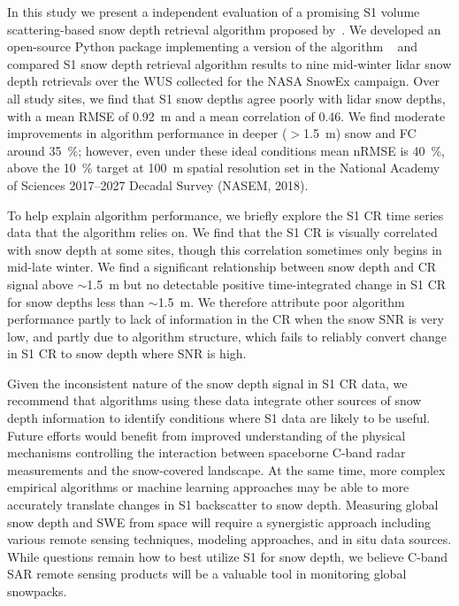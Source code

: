 \documentclass[journal abbreviation, manuscript]{copernicus}
\begin{document}
\conclusions  %

In this study we present a independent evaluation of a promising S1 volume scattering-based snow depth retrieval algorithm proposed by~\citet{Lievens.2022}. We developed an open-source Python package implementing a version of the algorithm ~\citep{Hoppinen.2023} and compared S1 snow depth retrieval algorithm results to nine mid-winter lidar snow depth retrievals over the WUS collected for the NASA SnowEx campaign. Over all study sites, we find that S1 snow depths agree poorly with lidar snow depths, with a mean RMSE of 0.92~m and a mean correlation of 0.46. We find moderate improvements in algorithm performance in deeper ($>$1.5~m) snow and FC around 35~\%; however, even under these ideal conditions mean nRMSE is 40~\%, above the 10~\% target at 100~m spatial resolution set in the National Academy of Sciences 2017--2027 Decadal Survey (NASEM, 2018)\nocite{Sciences.2018}. 

To help explain algorithm performance, we briefly explore the S1 CR time series data that the algorithm relies on. We find that the S1 CR is visually correlated with snow depth at some sites, though this correlation sometimes only begins in mid-late winter. We find a significant relationship between snow depth and CR signal above $\sim$1.5~m but no detectable positive time-integrated change in S1 CR for snow depths less than $\sim$1.5~m. We therefore attribute poor algorithm performance partly to lack of information in the CR when the snow SNR is very low, and partly due to algorithm structure, which fails to reliably convert change in S1 CR to snow depth where SNR is high. 

Given the inconsistent nature of the snow depth signal in S1 CR data, we recommend that algorithms using these data integrate other sources of snow depth information to identify conditions where S1 data are likely to be useful. Future efforts would benefit from improved understanding of the physical mechanisms controlling the interaction between spaceborne C-band radar measurements and the snow-covered landscape. At the same time, more complex empirical algorithms or machine learning approaches may be able to more accurately translate changes in S1 backscatter to snow depth. Measuring global snow depth and SWE from space will require a synergistic approach including various remote sensing techniques, modeling approaches, and in situ data sources. While questions remain how to best utilize S1 for snow depth, we believe C-band SAR remote sensing products will be a valuable tool in monitoring global snowpacks.
\end{document}

